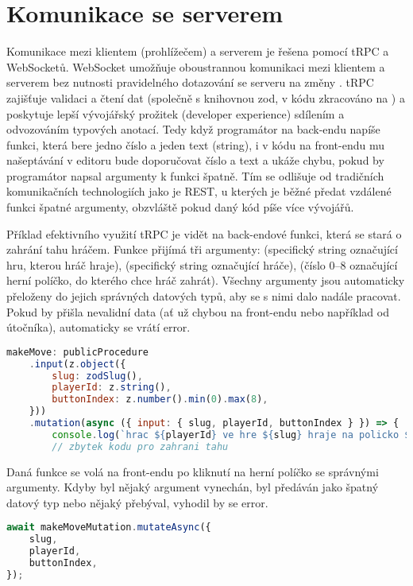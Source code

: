 \section{Komunikace se serverem}

Komunikace mezi klientem (prohlížečem) a serverem je řešena pomocí tRPC a
WebSocketů. WebSocket umožňuje oboustrannou komunikaci mezi klientem a serverem
bez nutnosti pravidelného dotazování se serveru na změny \cite{mdn-ws}. tRPC
zajišťuje validaci a čtení dat (společně s knihovnou zod, v kódu zkracováno na
) a poskytuje lepší vývojářský prožitek (developer experience) sdílením a
odvozováním typových anotací. Tedy když programátor na back-endu napíše funkci,
která bere jedno číslo a jeden text (string), i v kódu na front-endu mu
našeptávání v editoru bude doporučovat číslo a text a ukáže chybu, pokud by
programátor napsal argumenty k funkci špatně. Tím se odlišuje od tradičních
komunikačních technologiích jako je REST, u kterých je běžné předat vzdálené
funkci špatné argumenty, obzvláště pokud daný kód píše více vývojářů.

Příklad efektivního využití tRPC je vidět na back-endové funkci, která se stará
o zahrání tahu hráčem. Funkce přijímá tři argumenty:  (specifický
string označující hru, kterou hráč hraje),  (specifický string
označující hráče),  (číslo 0--8 označující herní políčko, do
kterého chce hráč zahrát). Všechny argumenty jsou automaticky přeloženy do
jejich správných datových typů, aby se s nimi dalo nadále pracovat. Pokud by
přišla nevalidní data (ať už chybou na front-endu nebo například od útočníka),
automaticky se vrátí error.

\begin{lstlisting}[language=JavaScript,caption={Funkce pro zahrání tahu},label={fig:be-make-move}]
makeMove: publicProcedure
    .input(z.object({
        slug: zodSlug(),
        playerId: z.string(),
        buttonIndex: z.number().min(0).max(8),
    }))
    .mutation(async ({ input: { slug, playerId, buttonIndex } }) => {
        console.log(`hrac ${playerId} ve hre ${slug} hraje na policko ${buttonIndex}`);
        // zbytek kodu pro zahrani tahu
\end{lstlisting}

Daná funkce se volá na front-endu po kliknutí na herní políčko se správnými
argumenty. Kdyby byl nějaký argument vynechán, byl předáván jako špatný datový
typ nebo nějaký přebýval, vyhodil by se error.

\begin{lstlisting}[language=JavaScript,caption={Volání funkce pro zahrání tahu},label={lst:make-move}]
await makeMoveMutation.mutateAsync({
    slug,
    playerId,
    buttonIndex,
});
\end{lstlisting}

